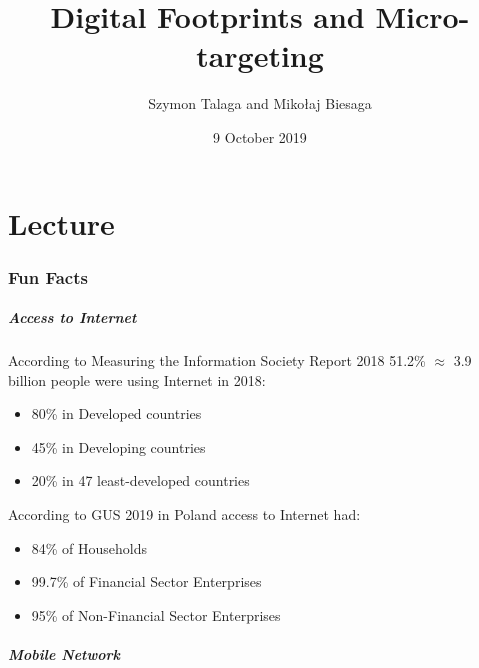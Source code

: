 \title[Digital Footprints \& Micro-targeting]{
    Digital Footprints and Micro-targeting
}
\author[]{Szymon Talaga and Mikołaj Biesaga} %
\date{9 October 2019} %

\frame{\titlepage}

\part[Lecture]{Lecture}
\frame{\partpage}

\section[Fun Facts]{Fun Facts}

\begin{frame}
    \frametitle{Access to Internet}
    According to Measuring the Information Society Report 2018 51.2\% $\approx$ 3.9 billion people were using Internet in 2018:
        \begin{itemize}
            \item 80\% in Developed countries
            \item 45\% in Developing countries
            \item 20\% in 47 least-developed countries
        \end{itemize}
    According to GUS 2019 in Poland access to Internet had:
        \begin{itemize}
            \item 84\% of Households
            \item 99.7\% of Financial Sector Enterprises
            \item 95\% of Non-Financial Sector Enterprises
        \end{itemize}
\end{frame}

\begin{frame}
    \frametitle{Mobile Network}
\end{frame}

